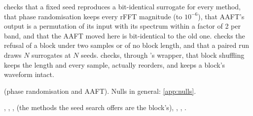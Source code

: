  checks that a fixed seed reproduces a bit-identical surrogate
for every method, that phase randomisation keeps every rFFT magnitude (to $10^{-6}$), that
AAFT's output is a permutation of its input with its spectrum within a factor of 2 per band,
and that the AAFT moved here is bit-identical to the old one.
 checks the refusal of a block under two samples
or of no block length, and that a paired run draws $N$ surrogates at $N$ seeds.
 checks, through 's wrapper, that block
shuffling keeps the length and every sample, actually reorders, and keeps a block's
waveform intact.

\citet{theiler1992testing} (phase randomisation and AAFT). Nulls in general: \cref{app:nulls}.

, ,
,  (the
methods the seed search offers are the block's), ,
, .
